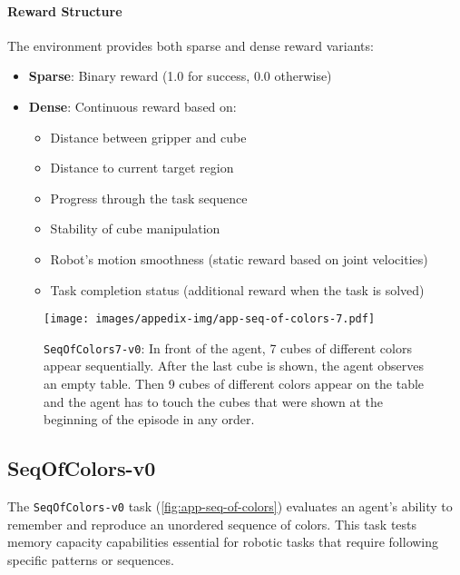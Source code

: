 \paragraph{Reward Structure} The environment provides both sparse and dense reward variants:
\begin{itemize}
    \item \textbf{Sparse}: Binary reward (1.0 for success, 0.0 otherwise)
    \item \textbf{Dense}: Continuous reward based on:
    \begin{itemize}
        \item Distance between gripper and cube
        \item Distance to current target region
        \item Progress through the task sequence
        \item Stability of cube manipulation
        \item Robot's motion smoothness (static reward based on joint velocities)
        \item Task completion status (additional reward when the task is solved)
    \end{itemize}
\end{itemize}

\newpage
\begin{figure*}[h!]
    \centering
    \texttt{[image: images/appedix-img/app-seq-of-colors-7.pdf]}
    \vspace{-15pt}
    \caption{\texttt{SeqOfColors7-v0}: In front of the agent, 7 cubes of different colors appear sequentially. After the last cube is shown, the agent observes an empty table. Then 9 cubes of different colors appear on the table and the agent has to touch the cubes that were shown at the beginning of the episode in any order.}
    \label{fig:app-seq-of-colors}
    \vspace{-15pt}
\end{figure*}
\subsection{SeqOfColors-v0}
\label{app:seq-of-colors}

The \texttt{SeqOfColors-v0} task (\autoref{fig:app-seq-of-colors}) evaluates an agent's ability to remember and reproduce an unordered sequence of colors. This task tests memory capacity capabilities essential for robotic tasks that require following specific patterns or sequences.

